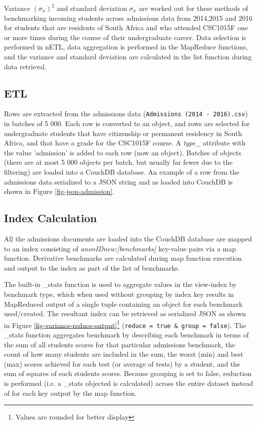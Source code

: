 Variance $(\sigma_{\overline{x}})^{2}$ and standard deviation $\sigma_{\overline{x}}$ are worked out for these methods of benchmarking incoming students across admissions data from 2014,2015 and 2016 for students that are residents of South Africa and who attended CSC1015F one or more times during the course of their undergraduate career. Data selection is performed in nETL, data aggregation is performed in the MapReduce functions, and the variance and standard deviation are calculated in the list function during data retrieval.

\subsection{ETL}
Rows are extracted from the admissions data (\texttt{Admissions (2014 - 2016).csv}) in batches of 5 000. Each row is converted to an object, and rows are selected for undergraduate students that have citizenship or permanent residency in South Africa, and that have a grade for the CSC1015F course. A \textit{type\_} attribute with the value 'admission' is added to each row (now an object). Batches of objects (there are at most 5 000 objects per batch, but usually far fewer due to the filtering) are loaded into a CouchDB database. An example of a row from the admissions data serialized to a JSON string and as loaded into CouchDB is shown in Figure \ref{fig-json-admission}.



\subsection{Index Calculation}
All the admissions documents are loaded into the CouchDB database are mapped to an index consisting of \textit{anonIDnew:[benchmarks]} key-value pairs via a map function. Derivative benchmarks are calculated during map function execution and output to the index as part of the list of benchmarks.

The built-in \_stats function is used to aggregate values in the view-index by benchmark type, which when used without grouping by index key results in MapReduced output of a single tuple containing an object for each benchmark used/created. The resultant index can be retrieved as serialized JSON as shown in Figure \ref{fig-variance-reduce-output}\footnote{Values are rounded for better display} (\texttt{reduce = true \& group = false}). The \_stats function aggregates benchmark by describing each benchmark in terms of the sum of all students scores for that particular admissions benchmark, the count of how many students are included in the sum, the worst (min) and best (max) scores achieved for each test (or average of tests) by a student, and the sum of squares of each students scores. Because grouping is set to false, reduction is performed (i.e. a \_stats objected is calculated) across the entire dataset instead of for each key output by the map function.

